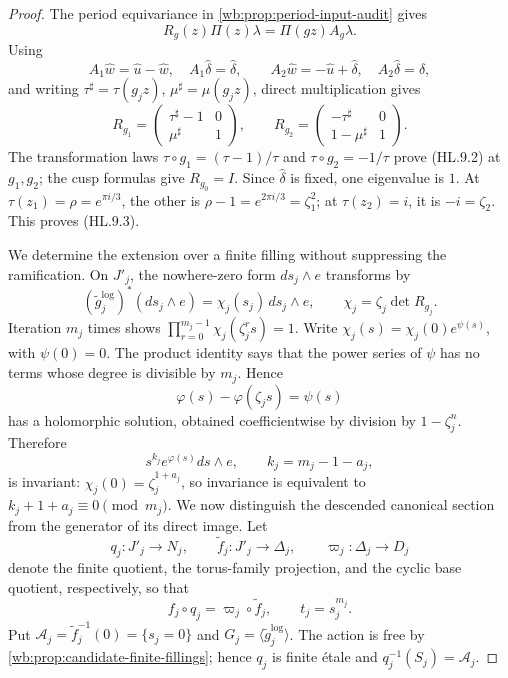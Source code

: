 \begin{proof}
The period equivariance in \cref{wb:prop:period-input-audit} gives
\[
 R_g(z)\Pi(z)\lambda=\Pi(gz)A_g\lambda.
\]
Using
\[
 A_1\widehat w=\widehat u-\widehat w,\quad
 A_1\widehat\delta=\widehat\delta,\qquad
 A_2\widehat w=-\widehat u+\widehat\delta,\quad
 A_2\widehat\delta=\widehat\delta,
\]
and writing \(\tau^\sharp=\tau(g_jz)\),
\(\mu^\sharp=\mu(g_jz)\), direct multiplication gives
\[
 R_{g_1}=
 \begin{pmatrix}\tau^\sharp-1&0\\ \mu^\sharp&1\end{pmatrix},
 \qquad
 R_{g_2}=
 \begin{pmatrix}-\tau^\sharp&0\\1-\mu^\sharp&1\end{pmatrix}.
\]
The transformation laws
\(\tau\circ g_1=(\tau-1)/\tau\) and
\(\tau\circ g_2=-1/\tau\) prove (HL.9.2) at \(g_1,g_2\); the cusp formulas
give \(R_{g_0}=I\).  Since \(\widehat\delta\) is fixed, one eigenvalue is
\(1\).  At \(\tau(z_1)=\rho=e^{\pi i/3}\), the other is
\(\rho-1=e^{2\pi i/3}=\zeta_1^2\); at \(\tau(z_2)=i\), it is
\(-i=\zeta_2\).  This proves (HL.9.3).

We determine the extension over a finite filling without suppressing the
ramification.  On \(J'_j\), the nowhere-zero form \(ds_j\wedge e\)
transforms by
\[
 (\widetilde g_j^{\log})^*(ds_j\wedge e)
 =\chi_j(s_j)\,ds_j\wedge e,
 \qquad \chi_j=\zeta_j\det R_{g_j}.
\tag{HL.9.4}
\]
Iteration \(m_j\) times shows
\(\prod_{r=0}^{m_j-1}\chi_j(\zeta_j^rs)=1\).
Write \(\chi_j(s)=\chi_j(0)e^{\psi(s)}\), with \(\psi(0)=0\).
The product identity says that the power series of \(\psi\) has no terms
whose degree is divisible by \(m_j\).  Hence
\[
 \varphi(s)-\varphi(\zeta_js)=\psi(s)
\]
has a holomorphic solution, obtained coefficientwise by division by
\(1-\zeta_j^n\).  Therefore
\[
 s^{k_j}e^{\varphi(s)}ds\wedge e,
 \qquad k_j=m_j-1-a_j,
\tag{HL.9.5}
\]
is invariant: \(\chi_j(0)=\zeta_j^{1+a_j}\), so invariance is equivalent
to \(k_j+1+a_j\equiv0\pmod {m_j}\).  We now distinguish the descended
canonical section from the generator of its direct image.  Let
\[
 q_j:J'_j\longrightarrow N_j,\qquad
 \widetilde f_j:J'_j\longrightarrow\Delta_j,\qquad
 \varpi_j:\Delta_j\longrightarrow D_j
\]
denote the finite quotient, the torus-family projection, and the cyclic base
quotient, respectively, so that
\[
 f_j\circ q_j=\varpi_j\circ\widetilde f_j,
 \qquad t_j=s_j^{m_j}.
\]
Put \(\mathcal A_j=\widetilde f_j^{-1}(0)=\{s_j=0\}\) and
\(G_j=\langle\widetilde g_j^{\log}\rangle\).  The action is free by
\cref{wb:prop:candidate-finite-fillings}; hence \(q_j\) is finite \'etale
and \(q_j^{-1}(S_j)=\mathcal A_j\).


\end{proof}
